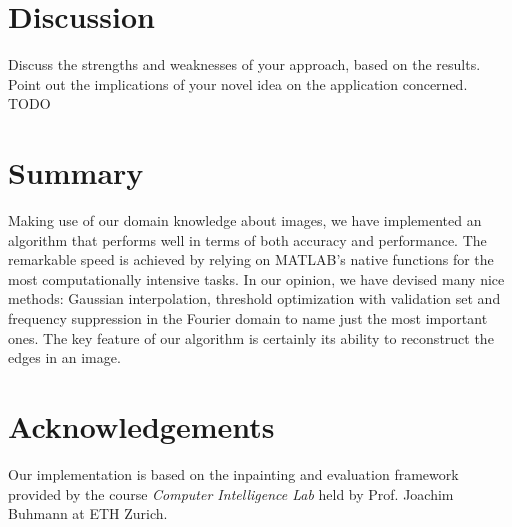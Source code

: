 \documentclass[10pt,conference,compsocconf]{IEEEtran}
\begin{document}
\section{Discussion}
Discuss the strengths and weaknesses of your approach, based on the results. Point out the implications of your novel idea on the application concerned. TODO

\section{Summary}
Making use of our domain knowledge about images, we have implemented an algorithm that performs well in terms of both accuracy and performance. The remarkable speed is achieved by relying on MATLAB's native functions for the most computationally intensive tasks. In our opinion, we have devised many nice methods: Gaussian interpolation, threshold optimization with validation set and frequency suppression in the Fourier domain to name just the most important ones. The key feature of our algorithm is certainly its ability to reconstruct the edges in an image.

\section*{Acknowledgements}
Our implementation is based on the inpainting and evaluation framework provided by the course \emph{Computer Intelligence Lab} held by Prof. Joachim Buhmann at ETH Zurich.



\end{document}
